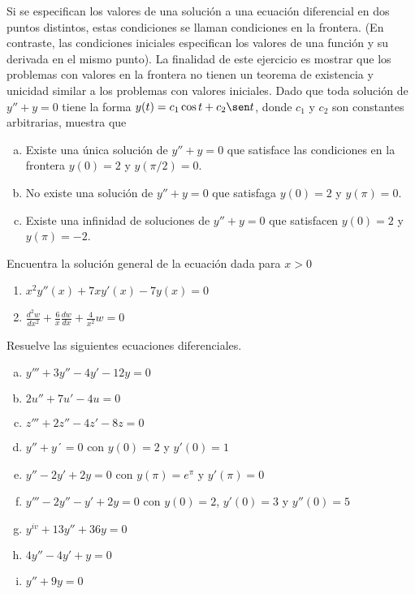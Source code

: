 \documentclass[12pt]{exam}
\begin{document}
\begin{questions}
     \question%
     Si se especifican los valores de una solución a una ecuación diferencial en dos puntos distintos, estas condiciones se llaman condiciones en la frontera. (En contraste, las condiciones iniciales especifican los valores de una función y su derivada en el mismo punto). La finalidad de este ejercicio es mostrar que los problemas con valores en la frontera no tienen un teorema de existencia y unicidad similar a los problemas con valores iniciales. Dado que toda solución de $y''+y=0$ tiene la forma $y(t)=c_1\cos t+c_2\sen t$, donde $c_1$ y $c_2$ son constantes arbitrarias, muestra que
     \begin{enumerate}[a)]
         \item Existe una única solución de $y''+y=0$ que satisface las condiciones en la frontera $y(0)=2$ y $y(\pi/2)=0$.
         \item No existe una solución de $y''+y=0$ que satisfaga $y(0)=2$ y $y(\pi)=0$.
         \item Existe una infinidad de soluciones de $y''+y=0$ que satisfacen $y(0)=2$ y $y(\pi)=-2$.
     \end{enumerate}


     \question%
     Encuentra la solución general de la ecuación dada para $x>0$
     \begin{enumerate}
         \item $x^2y''(x)+7xy'(x)-7y(x)=0$
         \item $\frac{d^2w}{dx^2}+\frac{6}{x}\frac{dw}{dx}+\frac{4}{x^2}w=0$
     \end{enumerate}
     

     
     
     \question%
     Resuelve las siguientes ecuaciones diferenciales.
     \begin{enumerate}[a)]
         \item $y'''+3y''-4y'-12y=0$
         \item $2u''+7u'-4u=0$
         \item $z'''+2z''-4z'-8z=0$
         \item $y''+y´=0$ con $y(0)=2$ y $y'(0)=1$
         \item $y''-2y'+2y=0$ con $y(\pi)=e^{\pi}$ y $y'(\pi)=0$
         \item $y'''-2y''-y'+2y=0$ con $y(0)=2$, $y'(0)=3$ y $y''(0)=5$
         \item $y^{iv}+13y''+36y=0$
         \item $4y''-4y'+y=0$
         \item $y''+9y=0$
     \end{enumerate}


\end{questions}
\end{document}
